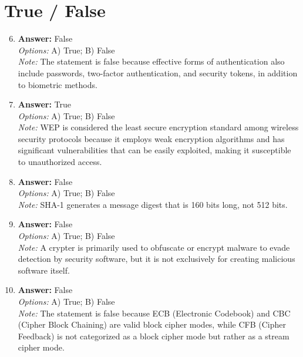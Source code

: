 \documentclass[12pt]{article}
\begin{document}
\section*{True / False}
\begin{enumerate}[label=\arabic*.]
\setcounter{enumi}{5}
\item \textbf{Answer:} False
\\ \textit{Options:} A) True; B) False
\\ \textit{Note:} The statement is false because effective forms of authentication also include passwords, two-factor authentication, and security tokens, in addition to biometric methods.
\item \textbf{Answer:} True
\\ \textit{Options:} A) True; B) False
\\ \textit{Note:} WEP is considered the least secure encryption standard among wireless security protocols because it employs weak encryption algorithms and has significant vulnerabilities that can be easily exploited, making it susceptible to unauthorized access.
\item \textbf{Answer:} False
\\ \textit{Options:} A) True; B) False
\\ \textit{Note:} SHA-1 generates a message digest that is 160 bits long, not 512 bits.
\item \textbf{Answer:} False
\\ \textit{Options:} A) True; B) False
\\ \textit{Note:} A crypter is primarily used to obfuscate or encrypt malware to evade detection by security software, but it is not exclusively for creating malicious software itself.
\item \textbf{Answer:} False
\\ \textit{Options:} A) True; B) False
\\ \textit{Note:} The statement is false because ECB (Electronic Codebook) and CBC (Cipher Block Chaining) are valid block cipher modes, while CFB (Cipher Feedback) is not categorized as a block cipher mode but rather as a stream cipher mode.
\end{enumerate}
\end{document}
